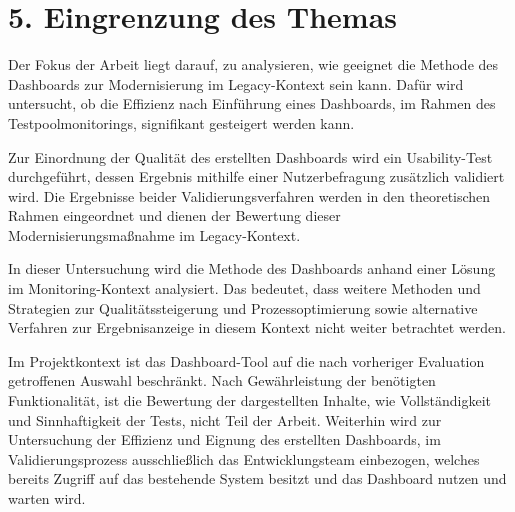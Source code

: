 \section*{5. Eingrenzung des Themas}
Der Fokus der Arbeit liegt darauf, zu analysieren, wie geeignet die Methode des Dashboards zur Modernisierung im Legacy-Kontext sein kann. Dafür wird untersucht, ob die Effizienz nach Einführung eines Dashboards, im Rahmen des Testpoolmonitorings, signifikant gesteigert werden kann.

Zur Einordnung der Qualität des erstellten Dashboards wird ein Usability-Test durchgeführt, dessen Ergebnis mithilfe einer Nutzerbefragung zusätzlich validiert wird. Die Ergebnisse beider Validierungsverfahren werden in den theoretischen Rahmen eingeordnet und dienen der Bewertung dieser Modernisierungsmaßnahme im Legacy-Kontext.

In dieser Untersuchung wird die Methode des Dashboards anhand einer Lösung im Monitoring-Kontext analysiert. Das bedeutet, dass weitere Methoden und Strategien zur Qualitätssteigerung und Prozessoptimierung sowie alternative Verfahren zur Ergebnisanzeige in diesem Kontext nicht weiter betrachtet werden.

Im Projektkontext ist das Dashboard-Tool auf die nach vorheriger Evaluation getroffenen Auswahl beschränkt. Nach Gewährleistung der benötigten Funktionalität, ist die Bewertung der dargestellten Inhalte, wie Vollständigkeit und Sinnhaftigkeit der Tests, nicht Teil der Arbeit. Weiterhin wird zur Untersuchung der Effizienz und Eignung des erstellten Dashboards, im Validierungsprozess ausschließlich das Entwicklungsteam einbezogen, welches bereits Zugriff auf das bestehende System besitzt und das Dashboard nutzen und warten wird.
